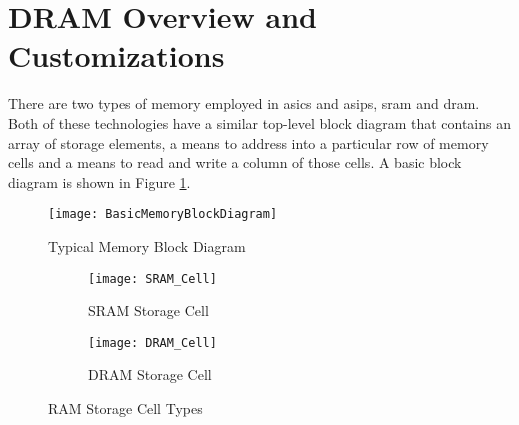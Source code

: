 
\section{DRAM Overview and Customizations}
\label{sec:DRAM Customizations}

There are two types of memory employed in \acp{asic} and \acp{asip}, \acf{sram} and \acf{dram}.
Both of these technologies have a similar top-level block diagram that contains an array of storage elements, a means to address into a particular row of memory cells and a means to read and write a column of those cells.
A basic block diagram is shown in Figure \ref{fig:MemoryBlockDiagram}.
\begin{figure}[h]
\centering
\captionsetup{justification=centering}
\centerline{
\mbox{\texttt{[image: BasicMemoryBlockDiagram]}}
}
\caption{Typical Memory Block Diagram \cite{Jacob:2007:MSC:1543376}}
\label{fig:MemoryBlockDiagram}
\end{figure}


\begin{figure}[h]
\centering
\begin{subfigure}{.45\textwidth}
  \centering
  \texttt{[image: SRAM\_Cell]}
  \captionsetup{justification=centering, skip=5pt}
  \vspace{-6pt}
  \caption{SRAM Storage Cell \cite{Jacob:2007:MSC:1543376}}
  \label{fig:SRAM Cell}
\end{subfigure}%
\begin{subfigure}{.45\textwidth}
  \centering
  \texttt{[image: DRAM\_Cell]}
  \captionsetup{justification=centering, skip=5pt}
  \vspace{20pt}
  \caption{DRAM Storage Cell \cite{Jacob:2007:MSC:1543376}}
  \label{fig:DRAM Cell}
\end{subfigure}
\captionsetup{justification=centering, skip=12pt}
\caption{RAM Storage Cell Types}
\label{fig:Memory Storage Cells}
\end{figure}

